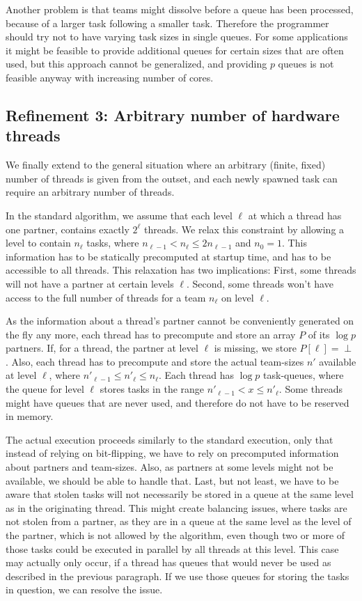 \documentclass[preprint]{sigplanconf}
\begin{document}
Another problem is that teams might dissolve before a queue has been
processed, because of a larger task following a smaller
task. Therefore the programmer should try not to have varying task
sizes in single queues. For some applications it might be feasible to
provide additional queues for certain sizes that are often used, but
this approach cannot be generalized, and providing $p$ queues is not
feasible anyway with increasing number of cores.

\subsection{Refinement 3: Arbitrary number of hardware threads}

We finally extend to the general situation where an arbitrary (finite,
fixed) number of threads is given from the outset, and
each newly spawned task can require an arbitrary number of threads.

In the standard algorithm, we assume that each level $\ell$ at which a
thread has one partner, contains exactly $2^{\ell}$ threads. We relax
this constraint by allowing a level to contain $n_{\ell}$ tasks, where
$n_{\ell-1} < n_{\ell} \leq 2n_{\ell-1}$ and $n_{0}=1$. This
information has to be statically precomputed at startup time, and has to
be accessible to all threads. This relaxation has two implications:
First, some threads will not have a partner at certain levels
$\ell$. Second, some threads won't have access to the full number of
threads for a team $n_{\ell}$ on level $\ell$.

As the information about a thread's partner cannot be conveniently
generated on the fly any more, each thread has to precompute and
store an array $P$ of its $\log p$ partners. If, for a thread, the
partner at level $\ell$ is missing, we store $P[{\ell}]=\perp$. Also,
each thread has to precompute and store the actual team-sizes $n'$
available at level $\ell$, where $n'_{\ell-1} \leq n'_{\ell} \leq
n_{\ell}$. Each thread has $\log p$ task-queues, where the queue for
level $\ell$ stores tasks in the range $n'_{\ell-1} < x \leq
n'_{\ell}$. Some threads might have queues that are never used, and
therefore do not have to be reserved in memory.

The actual execution proceeds similarly to the standard execution,
only that instead of relying on bit-flipping, we have to rely on
precomputed information about partners and team-sizes. Also, as
partners at some levels might not be available, we should be able to
handle that. Last, but not least, we have to be aware that stolen
tasks will not necessarily be stored in a queue at the same level as
in the originating thread. This might create balancing issues, where
tasks are not stolen from a partner, as they are in a queue at the
same level as the level of the partner, which is not allowed by the
algorithm, even though two or more of those tasks could be executed in
parallel by all threads at this level. This case may actually only
occur, if a thread has queues that would never be used as described in
the previous paragraph. If we use those queues for storing the tasks
in question, we can resolve the issue. 
\end{document}
